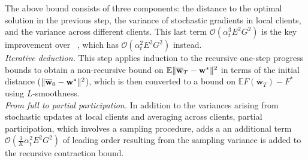 The above bound consists of three components: the distance to the optimal solution 
in the previous step, 
the variance of stochastic gradients in local clients, and the variance
across different clients. This last term $\mathcal{O}(\alpha_{t}^{3}E^{2}G^{2})$ is the key improvement over ~\cite{li2019convergence}, which has $\mathcal{O}(\alpha_{t}^{2}E^2 G^2)$ instead.\\
\textit{Iterative deduction.} This step applies induction to the recursive one-step progress bounds to obtain a non-recursive bound on $\mathbb{E}\|{\overline{\mathbf{w}}}_{T}-{\mathbf{w}}^{\ast}\|^{2}$ in terms of the initial distance ($\|{\overline{\mathbf{w}}}_{0}-{\mathbf{w}}^{\ast}\|^{2}$), which is then converted to a bound on $\mathbb{E}F(\overline{\mathbf{w}}_{T})-F^{\ast}$ using $L$-smoothness.\\
\textit{From full to partial participation.} In addition to the variances arising from stochastic updates at local clients and averaging across clients, partial participation, which involves a sampling procedure, adds a an additional term $\mathcal{O}(\frac{1}{K} \alpha_t^2 E^2G^2)$ of leading order resulting from the sampling variance is added to the recursive contraction bound.

\begin{comment}
A crucial ingredient in the proof of Theorem~\ref{th:scvx_sgd} is a one step contraction bound 
	\begin{align*}
	\mathbb{E}\|\ov{w}_{t+1}-\vw^{\ast}\|^{2} & \leq(1-\mu\alpha_{t})\mathbb{E}\|\ov{w}_{t}-\vw^{\ast}\|^{2}+\alpha_{t}^{2}\frac{1}{N}\nu_{max}^{2}\sigma^{2}+6E^{2}L\alpha_{t}^{3}G^{2} 
	\end{align*}
that improves upon the analysis in~\cite{li2019convergence} to deliver the linear speedup. Moreover, analogues of this bound appear in the analyses of the convex setting as well as the Nesterov accelerated FedAvg.\\
\end{comment}

